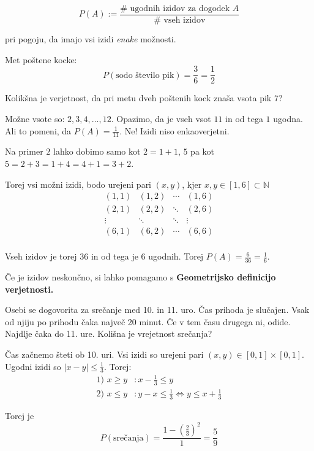 \documentclass[12pt]{book}
\def\n{\noindent}
\theoremstyle{definition}
\theoremstyle{plain}
\theoremstyle{plain}
\theoremstyle{plain}
\theoremstyle{remark}
\begin{document}
$$P(A):= \frac{\# \text{ ugodnih izidov za dogodek } A}{\# \text{ vseh izidov}}$$

pri pogoju, da imajo vsi izidi \emph{enake} možnosti.

\begin{zgled}
    Met poštene kocke: 
    $$P(\text{sodo število pik}) = \frac{3}{6} = \frac{1}{2}$$
\end{zgled}

\begin{zgled}
    Kolikšna je verjetnost, da pri metu dveh poštenih kock znaša vsota pik $7$?
    
    Možne vsote so: $2, 3, 4, \dots , 12$. Opazimo, da je vseh vsot $11$ in od tega $1$ ugodna. Ali to pomeni, da $P(A)=\frac{1}{11}$. Ne! Izidi niso enkaoverjetni. 
    
    Na primer $2$ lahko dobimo samo kot $2=1+1$, $5$ pa kot $5=2+3=1+4=4+1=3+2$. 

    Torej vsi možni izidi, bodo urejeni pari $(x, y)$, kjer $x, y \in[1,6] \subset \mathbb{N}$
    $$
    \begin{array}{cccc}
        (1,1) & (1,2) & \cdots & (1,6) \\
        (2,1) & (2,2) & \ddots & (2,6)\\
        \vdots & \ddots & \ddots & \vdots \\
        (6,1) & (6,2) & \cdots & (6,6) \\
    \end{array}
    $$

    Vseh izidov je torej $36$ in od tega je $6$ ugodnih. Torej $P(A)= \frac{6}{36}=\frac{1}{6}$.
\end{zgled}

\n Če je izidov neskončno, si lahko pomagamo s \textbf{Geometrijsko definicijo verjetnosti.}

\begin{zgled}
    Osebi se dogovorita za srečanje med 10. in 11. uro. Čas prihoda je slučajen. Vsak od njiju po prihodu čaka največ 20 minut. Če v tem času drugega ni, odide. Najdlje čaka do 11. ure. Kolišna je vrejetnost srečanja?

    Čas začnemo šteti ob 10. uri. Vsi izidi so urejeni pari $(x, y) \in [0,1] \times[0,1]$. Ugodni izidi so $|x-y| \leq \frac{1}{3}$. Torej: 
    $$
    \begin{aligned}
        \text{1) } x \geq y &: x-\frac{1}{3} \leq y \\
        \text{2) } x \leq y &: y-x \leq \frac{1}{3} \iff y \leq x+\frac{1}{3}
    \end{aligned}
    $$

    Torej je $$P(\text{srečanja})=\frac{1-\left(\frac{2}{3}\right)^2}{1}=\frac{5}{9}$$
\end{zgled}
\end{document}

